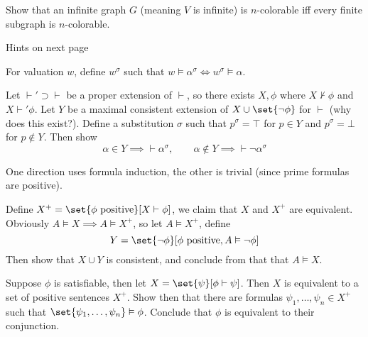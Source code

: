     Show that an infinite graph $G$ (meaning $V$ is infinite) is $n$-colorable iff every finite subgraph is $n$-colorable.

\eprob

\vfill
\centerline{Hints on next page}

\break

\setcounter{math counter}{2}

\bhint

    For valuation $w$, define $w^\sigma$ such that
    $w\vDash\alpha^\sigma\iff w^\sigma\vDash\alpha$.

\ehint

\bhint

    Let ${\vdash'}\supset{\vdash}$ be a proper extension of $\vdash$, so there exists $X,\phi$
    where $X\nvdash\phi$ and $X\vdash'\phi$.
    Let $Y$ be a maximal consistent extension of $X\cup\set{\neg\phi}$ for $\vdash$ (why does this
    exist?).
    Define a substitution $\sigma$ such that $p^\sigma=\top$ for $p\in Y$ and $p^\sigma=\bot$ for
    $p\notin Y$.
    Then show
    $$ \alpha\in Y\implies\vdash\alpha^\sigma,\qquad
    \alpha\notin Y\implies\vdash\neg\alpha^\sigma $$

\ehint

\bhint

    \benum
        \item One direction uses formula induction, the other is trivial (since prime formulas are
        positive).
        \item Define $X^+=\set{\phi\hbox{ positive}}[X\vdash\phi]$, we claim that $X$ and $X^+$
        are equivalent.
        Obviously $A\vDash X\implies A\vDash X^+$, so let $A\vDash X^+$, define
        $$ Y = \set{\neg\phi}[\phi\hbox{ positive},A\vDash\neg\phi] $$
        Then show that $X\cup Y$ is consistent, and conclude from that that $A\vDash X$.
        \item Suppose $\phi$ is satisfiable, then let $X=\set{\psi}[\phi\vdash\psi]$.
        Then $X$ is equivalent to a set of positive sentences $X^+$.
        Show then that there are formulas $\psi_1,\dots,\psi_n\in X^+$ such that
        $\set{\psi_1,\dots,\psi_n}\vDash\phi$.
        Conclude that $\phi$ is equivalent to their conjunction.
    \eenum

\ehint

\bye

